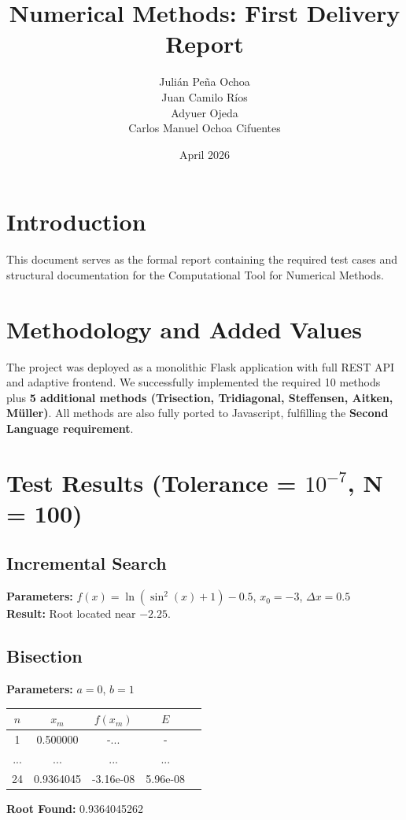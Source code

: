 \documentclass[12pt,a4paper]{article}
\title{Numerical Methods: First Delivery Report}
\author{Julián Peña Ochoa \\ Juan Camilo Ríos \\ Adyuer Ojeda \\ Carlos Manuel Ochoa Cifuentes}
\date{April 2026}
\begin{document}
\maketitle

\tableofcontents
\newpage

\section{Introduction}
This document serves as the formal report containing the required test cases and structural documentation for the Computational Tool for Numerical Methods.

\section{Methodology and Added Values}
The project was deployed as a monolithic Flask application with full REST API and adaptive frontend. 
We successfully implemented the required 10 methods plus \textbf{5 additional methods (Trisection, Tridiagonal, Steffensen, Aitken, Müller)}. 
All methods are also fully ported to Javascript, fulfilling the \textbf{Second Language requirement}.

\section{Test Results (Tolerance = $10^{-7}$, N = 100)}

\subsection{Incremental Search}
\textbf{Parameters:} $f(x) = \ln(\sin^2(x) + 1) - 0.5$, $x_0 = -3$, $\Delta x = 0.5$ \\
\textbf{Result:} Root located near $-2.25$.

\subsection{Bisection}
\textbf{Parameters:} $a = 0$, $b = 1$
\begin{center}
\begin{tabular}{c c c c c}
\toprule
$n$ & $x_m$ & $f(x_m)$ & $E$ \\
\midrule
1 & 0.500000 & -... & - \\
... & ... & ... & ... \\
24 & 0.9364045 & -3.16e-08 & 5.96e-08 \\
\bottomrule
\end{tabular}
\end{center}
\textbf{Root Found:} 0.9364045262
\end{document}
